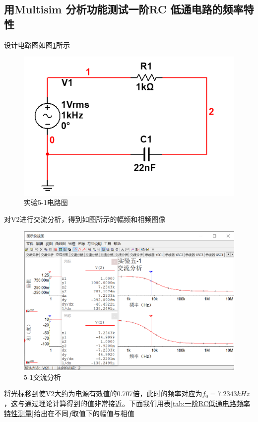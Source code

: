 \documentclass{ctexart}
\begin{document}
\subsection{用Multisim 分析功能测试一阶RC 低通电路的频率特性}
设计电路图如图\ref{fig:实验5-1电路图}所示
\begin{figure}[ht]
    \centering
    \includegraphics{pic/实验5-1电路图.png}
    \caption{实验5-1电路图}
    \label{fig:实验5-1电路图}
\end{figure}
对V2进行交流分析，得到如图所示的幅频和相频图像
\begin{figure}[h]
    \centering
    \includegraphics[scale=0.5]{pic/实验5-1,相频特性.png}
    \caption{5-1交流分析}
    \label{fig:5-1交流分析}
\end{figure}
将光标移到使V2大约为电源有效值的0.707倍，此时的频率对应为$f_0=7.2343kHz$，这与通过理论计算得到的值非常接近。下面我们用表\ref{tab:一阶RC低通电路频率特性测量}给出在不同$f$取值下的幅值与相值
\end{document}

